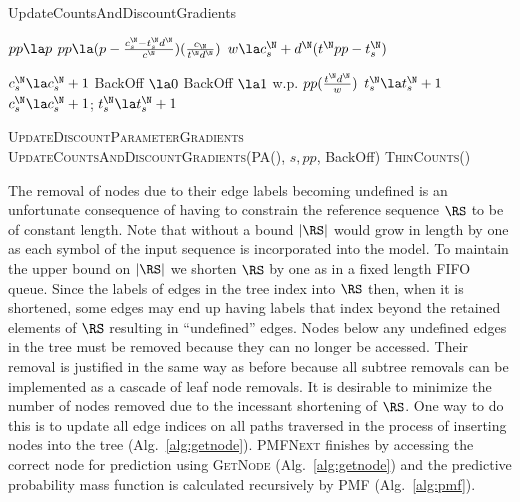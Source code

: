 \begin{algorithm}[t!]
	\caption{UpdateCountsAndDiscountGradients} \label{alg:updatecountsandgradients}
	\begin{algorithmic}[1]
	
		\State $pp \la p$
			\State $pp \la (p - \frac{c^\N_s - t^\N_s d^{\N}}{c^\N})(\frac{c_\N}{t^\N d^{\N}})$
			\State $w \la c^\N_s	+ d^\N (t^\N pp   - t^\N_s)$		
		\EndIf
		
			\State $c^\N_s \la c^\N_s + 1$
			\State BackOff $\la 0$
			\State BackOff $\la 1$ w.p. $pp (\frac{t^\N d^{\N}}{w})$ 
				\State $t^\N_s \la t^\N_s + 1$
			 \EndIf
				\State $c^\N_s \la c^\N_s + 1$;  $t^\N_s \la t^\N_s + 1$
		\EndIf
		
		\State \textsc{UpdateDiscountParameterGradients}%
		\State \textsc{UpdateCountsAndDiscountGradients}(\textsc{PA}(\N), $s,pp$, BackOff)
		\State \textsc{ThinCounts}(\N)
	\EndFunction
		\end{algorithmic}
\end{algorithm}


The removal of nodes due to their edge labels becoming undefined is an unfortunate consequence of having to constrain the reference sequence $\RS$ to be of constant length.  Note that without a bound $|\RS|$ would grow in length by one as each symbol of the input sequence is incorporated into the model.  To maintain the upper bound on $|\RS|$ we shorten $\RS$ by one as in a fixed length FIFO queue. Since the labels of edges in the tree index into $\RS$ then, when it is shortened, some edges may end up having labels that index beyond the retained elements of $\RS$ resulting in ``undefined'' edges.  Nodes below any undefined edges in the tree must be removed because they can no longer be accessed.  Their removal is justified in the same way as before because all subtree removals can be implemented as a cascade of leaf node removals.  It is desirable to minimize the number of nodes removed due to the incessant shortening of $\RS$.  One way to do this is to update all edge indices on all paths traversed in the process of inserting nodes into the tree (Alg.~\ref{alg:getnode}). %
\textsc{PMFNext} finishes by accessing the correct node for prediction using \textsc{GetNode} (Alg.~\ref{alg:getnode}) and the predictive probability mass function is calculated recursively by \textsc{PMF} (Alg.~\ref{alg:pmf}).

